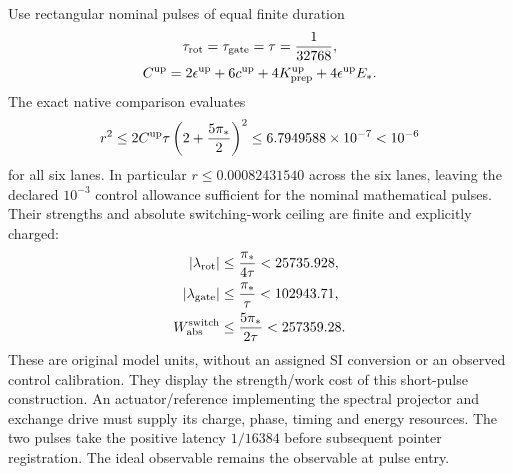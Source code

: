 Use rectangular nominal pulses of equal finite duration
\begin{equation}
\begin{gathered}
\tau_{\rm rot}=\tau_{\rm gate}=\tau=\frac1{32768},\\
 C^{\rm up}=2\epsilon^{\rm up}+6c^{\rm up}
                   +4K_{\rm prep}^{\rm up}+4\epsilon^{\rm up}E_* .
\end{gathered}
\label{eq:chvisd-explicit-times}
\end{equation}
The exact native comparison evaluates
\begin{equation}
 r^2\leq2C^{\rm up}\tau\left(2+\frac{5\pi_*}{2}\right)^2
       \leq6.7949588\times10^{-7}<10^{-6}
\label{eq:chvisd-pulse-feasibility}
\end{equation}
for all six lanes. In particular $r\leq0.00082431540$ across the
six lanes, leaving the declared $10^{-3}$ control allowance sufficient
for the nominal mathematical pulses. Their strengths and absolute
switching-work ceiling are finite and explicitly charged:
\begin{equation}
\begin{aligned}
 |\lambda_{\rm rot}|&\leq\frac{\pi_*}{4\tau}
                                      <25735.928,\\
 |\lambda_{\rm gate}|&\leq\frac{\pi_*}{\tau}
                                      <102943.71,\\
 W_{\rm abs}^{\rm switch}&\leq\frac{5\pi_*}{2\tau}
                                      <257359.28.
\end{aligned}
\label{eq:chvisd-pulse-resources}
\end{equation}
These are original model units, without an assigned SI conversion or
an observed control calibration. They display the strength/work cost
of this short-pulse construction. An actuator/reference implementing
the spectral projector and exchange drive must supply its charge,
phase, timing and energy resources. The two pulses take the positive
latency $1/16384$ before subsequent pointer registration. The ideal
observable remains the observable at pulse entry.



